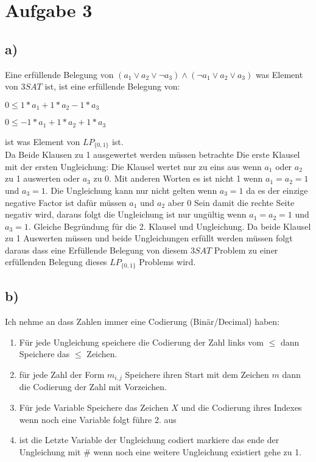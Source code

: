 \section*{Aufgabe 3}

\subsection*{a)}
 Eine erfüllende Belegung von $(a_1 \vee a_2 \vee \neg a_3)\wedge (\neg a_1 \vee  a_2  \vee a_3)$ was Element von $3SAT$ ist, ist eine erfüllende Belegung von:
 \begin{list}{}{}
 \item $0 \leq 1*a_1+1*a_2-1*a_3$
 \item $0 \leq -1*a_1+1*a_2+1*a_3$
 \end{list} ist was Element von $LP_{\{0,1\}} $ ist. \\
 
Da Beide Klausen zu 1 ausgewertet werden müssen betrachte Die erste Klausel mit der ersten Ungleichung:
Die Klausel wertet nur zu eins aus wenn $a_1$ oder $a_2$ zu 1 auswerten oder $a_3$ zu 0. Mit anderen Worten es ist nicht 1 wenn $a_1=a_2=1$ und $a_3=1$. Die Ungleichung kann nur nicht gelten wenn $a_3=1$ da es der einzige negative Factor ist dafür müssen $a_1$ und $a_2$ aber 0 Sein damit die rechte Seite negativ wird, daraus folgt die Ungleichung ist nur ungültig wenn $a_1=a_2=1$ und $a_3=1$. 
Gleiche Begründung für die 2. Klausel und Ungleichung. Da beide Klausel zu 1 Auswerten müssen und beide Ungleichungen erfüllt werden müssen folgt daraus dass eine Erfüllende Belegung von diesem $3SAT$ Problem zu einer erfüllenden Belegung dieses $LP_{\{0,1\}}$ Problems wird.

\subsection*{b)}
Ich nehme an dass Zahlen immer eine Codierung (Binär/Decimal) haben:
\begin{enumerate}
\item Für jede Ungleichung speichere die Codierung der Zahl links vom $\leq$ dann Speichere das $\leq$ Zeichen.
\item für jede Zahl der Form $m_{i,j}$ Speichere ihren Start mit dem Zeichen $m$ dann die Codierung der Zahl mit Vorzeichen.
\item Für jede Variable Speichere das Zeichen $X$ und die Codierung ihres Indexes wenn noch eine Variable folgt führe 2. aus
\item ist die Letzte Variable der Ungleichung codiert markiere das ende der Ungleichung mit \# wenn noch eine weitere Ungleichung existiert gehe zu 1.

\end{enumerate}

